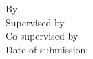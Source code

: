 \AddToShipoutPicture*{\TitleWatermark}%
\vspace{2.5cm}
{
    \begin{center}
	\small
	\textbf{\thesisSubject}\\
	\vspace{1.5cm}
	\large\textit{\thesisTitle} \\
	\vspace{1.5cm}
	\normalsize By \thesisName \\
	\vspace{1.5cm}
	Supervised by \thesisInternalSupervisor \\[-0.5ex]
	Co-supervised by \thesisInternalCoSupervisor \\[1.5em]
	Date of submission: \thesisDate \\
	\end{center}
	\vspace{5.0cm}
	\small
	\textbf{\thesisUniversity} \\
	\textit{\thesisFaculty} \\
	\thesisInstitute \\
  \thesisInstituteSecond \\
	\thesisAddress \\
	\thesisPostal\ \thesisCity
}
